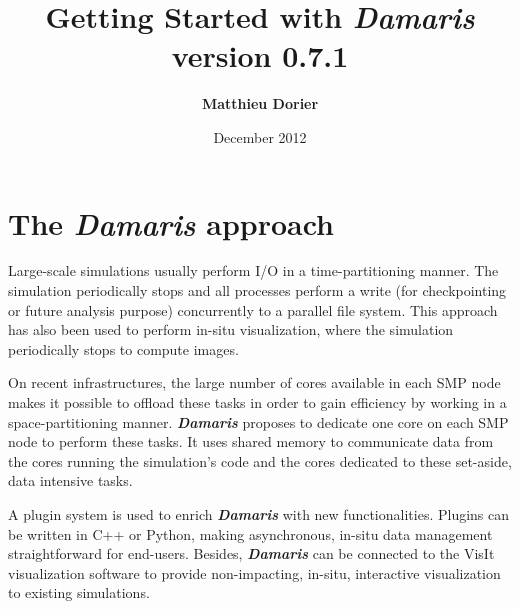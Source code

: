 \documentclass[11pt]{report}
\newcommand{\Damaris}{\emph{\textbf{Damaris}}}
\begin{document}
\title{\Huge{ 
	 Getting Started with \Damaris{}} \\
	\normalsize{} version 0.7.1}

\author{\textbf{Matthieu Dorier}}
\date{December 2012}
\maketitle

\setcounter{tocdepth}{1}
\tableofcontents

\chapter*{The \Damaris{} approach}

Large-scale simulations usually perform I/O in a time-partitioning manner.
The simulation periodically stops and all processes perform a write (for checkpointing
or future analysis purpose) concurrently to a parallel file system. This approach has also been
used to perform in-situ visualization, where the simulation periodically stops to compute images.

On recent infrastructures, the large number of cores available in each SMP node makes
it possible to offload these tasks in order to gain efficiency by working in a space-partitioning manner.
\Damaris{} proposes to dedicate one core on each SMP node to perform these tasks.
It uses shared memory to communicate data from the cores running the simulation's code and
the cores dedicated to these set-aside, data intensive tasks.

A plugin system is used to enrich \Damaris{} with new functionalities. Plugins can be written
in C++ or Python, making asynchronous, in-situ data management straightforward for end-users.
Besides, \Damaris{} can be connected to the VisIt visualization software to provide
non-impacting, in-situ, interactive visualization to existing simulations.



\end{document}
